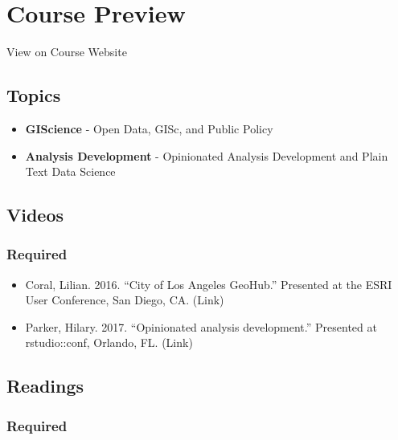 \documentclass[]{book}
\providecommand{\tightlist}{%
  \setlength{\itemsep}{0pt}\setlength{\parskip}{0pt}}
\begin{document}
\hypertarget{course-preview}{%
\section*{Course Preview}\label{course-preview}}

View on Course Website

\hypertarget{topics}{%
\subsection*{Topics}\label{topics}}

\begin{itemize}
\tightlist
\item
  \textbf{GIScience} - Open Data, GISc, and Public Policy
\item
  \textbf{Analysis Development} - Opinionated Analysis Development and Plain Text Data Science
\end{itemize}

\hypertarget{videos}{%
\subsection*{Videos}\label{videos}}

\hypertarget{required}{%
\subsubsection*{Required}\label{required}}

\begin{itemize}
\tightlist
\item
  Coral, Lilian. 2016. ``City of Los Angeles GeoHub.'' Presented at the ESRI User Conference, San Diego, CA. (Link)
\item
  Parker, Hilary. 2017. ``Opinionated analysis development.'' Presented at rstudio::conf, Orlando, FL. (Link)
\end{itemize}

\hypertarget{readings-1}{%
\subsection*{Readings}\label{readings-1}}

\hypertarget{required-1}{%
\subsubsection*{Required}\label{required-1}}
\end{document}
